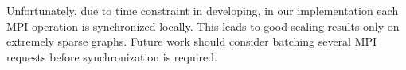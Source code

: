Unfortunately, due to time constraint in developing, in our implementation each MPI operation is
synchronized locally.
This leads to good scaling results only on extremely sparse graphs. %
Future work should consider batching several MPI requests before synchronization is required.

